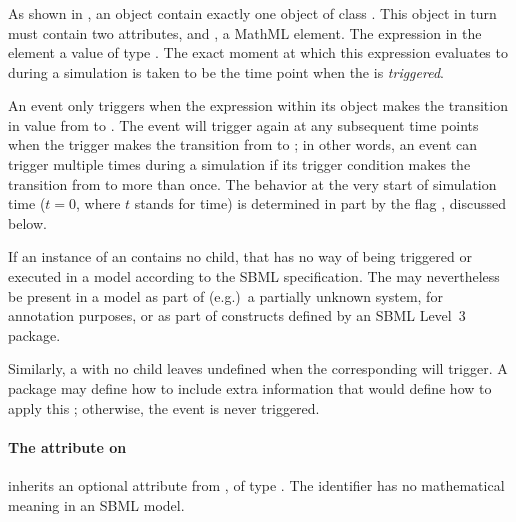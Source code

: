 \subsubsection{}
\label{sec:trigger}
\label{sec:event-trigger}

As shown in , an \Event object  contain
exactly one object of class \Trigger.  This object in turn must
contain two attributes,  and
,  a MathML  element.
The expression in the  element  a
value of type .  The exact moment at which this
expression evaluates to  during a simulation is taken to
be the time point when the \Event is \emph{triggered}.

An event only triggers when the expression within its \Trigger object
makes the transition in value from  to .  The
event will trigger again at any subsequent time points when the
trigger makes the transition from  to ; in
other words, an event can trigger multiple times during a simulation
if its trigger condition makes the transition from  to
 more than once.  The behavior at the very start of
simulation time (\ie $t = 0$, where $t$ stands for time) is
determined in part by the  flag
, discussed below.

\begin{blockChanged}
If an instance of an \Event contains no \Trigger child, that \Event has no way of being triggered or executed in a model according to the SBML \thisLV specification.  The \Event may nevertheless be present in a model as part of (e.g.)\ a partially unknown system, for annotation purposes, or as part of constructs defined by an SBML Level~3 package.

Similarly, a \Trigger with no  child leaves undefined when the corresponding \Event will trigger.  A package may define how to include extra information that would define how to apply this \Trigger; otherwise, the event is never triggered.
\end{blockChanged}


\begin{blockChanged}
\paragraph{The  attribute on }
\label{sec:trigger-id}

\Trigger inherits an optional  attribute from \SBase, of type .  The identifier has no mathematical meaning in an SBML \thisLV model.
\end{blockChanged}


